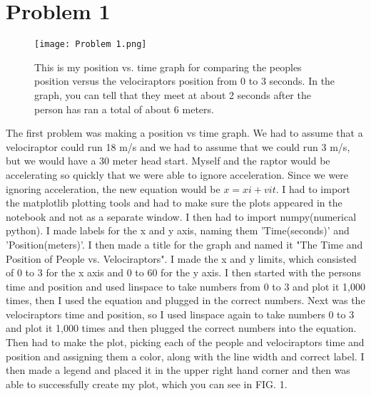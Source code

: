 \documentclass[twocolumn]{revtex4}
\begin{document}
\section{Problem 1}
\begin{figure}[b]
    \texttt{[image: Problem 1.png]}
    \centering
    \caption{This is my position vs. time graph for comparing the peoples position versus the velociraptors position from 0 to 3 seconds. In the graph, you can tell that they meet at about 2 seconds after the person has ran a total of about 6 meters.\label{fig:Plot 1}}
\end{figure}
The first problem was making a position vs time graph. We had to assume that a velociraptor could run 18 m/s and we had to assume that we could run 3 m/s, but we would have a 30 meter head start. Myself and the raptor would be accelerating so quickly that we were able to ignore acceleration. Since we were ignoring acceleration, the new equation would be $x = xi + vi t$. I had to import the matplotlib plotting tools and had to make sure the plots appeared in the notebook and not as a separate window. I then had to import numpy(numerical python). I made labels for the x and y axis, naming them 'Time(seconds)' and 'Position(meters)'. I then made a title for the graph  and named it "The Time and Position of People vs. Velociraptors". I made the x and y limits, which consisted of 0 to 3 for the x axis and 0 to 60 for the y axis. I then started with the persons time and position and used linspace to take numbers from 0 to 3 and plot it 1,000 times, then I used the equation and plugged in the correct numbers. Next was the velociraptors time and position, so I used linspace again to take numbers 0 to 3 and plot it 1,000 times and then plugged the correct numbers into the equation. Then had to make the plot, picking each of the people and velociraptors time and position and assigning them a color, along with the line width and correct label. I then made a legend and placed it in the upper right hand corner and then was able to successfully create my plot, which you can see in FIG. 1.

\end{document}
